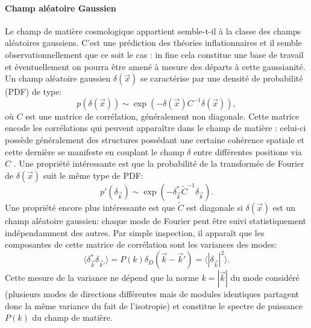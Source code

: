 \paragraph{Champ aléatoire Gaussien} Le champ de matière cosmologique appartient semble-t-il à la classe des champs aléatoires gaussiens. C'est une prédiction des théories inflationnaires et il semble observationnellement que ce soit le cas : in fine cela constitue une base de travail et éventuellement on pourra être amené à mesure des départs à cette gaussianité. Un champ aléatoire gaussien $\delta(\vec x)$ se caractérise par une densité de probabilité (PDF)  de type:
\begin{equation}
p(\delta(\vec x)) \sim \exp( -\delta (\vec x) C^{-1} \delta (\vec x)),
\end{equation}
où $C$ est une matrice de corrélation, généralement non diagonale. Cette matrice encode les corrélations qui peuvent apparaître dans le champ de matière : celui-ci possède généralement des structures possédant une certaine cohérence spatiale et cette dernière se manifeste en couplant le champ $\delta$ entre différentes positions via $C$ . Une propriété intéressante est que la probabilité de la transformée de Fourier de $\delta (\vec x)$ suit le même type de PDF:
\begin{equation}
p'(\delta_{\vec k})\sim \exp( -\delta_{\vec k}^* \tilde C^{-1} \delta_{\vec k}).
\end{equation}
Une propriété encore plus intéressante est que $\tilde C$ est diagonale si $\delta(\vec x)$ est un champ aléatoire gaussien: chaque mode de Fourier peut être suivi statistiquement indépendamment des autres. Par simple inspection, il apparaît que les composantes de cette matrice de corrélation sont les variances des modes:
\begin{equation}
\langle \delta_{\vec k}^* \delta_{\vec k'}\rangle = P(k)\delta_D(\vec k -\vec k')=\langle|\delta_{\vec k}|^2\rangle.
\end{equation}
Cette mesure de la variance ne dépend que la norme $k=|\vec k|$ du mode considéré (plusieurs modes de directions différentes mais de modules identiques partagent donc la même variance du fait de l'isotropie) et constitue le spectre de puissance $P(k)$ du champ de matière.

